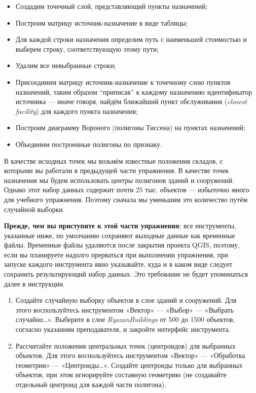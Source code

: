 \documentclass[
  12pt,
]{book}
\providecommand{\tightlist}{%
  \setlength{\itemsep}{0pt}\setlength{\parskip}{0pt}}
\begin{document}
\begin{itemize}
\tightlist
\item
  Создадим точечный слой, представляющий пункты назначений;
\item
  Построим матрицу источник-назначение в виде таблицы;
\item
  Для каждой строки назначения определим путь с наименьшей стоимостью и выберем строку, соответствующую этому пути;
\item
  Удалим все невыбранные строки;
\item
  Присоединим матрицу источник-назначение к точечному слою пунктов назначений, таким образом ``приписав'' к каждому назначению идентификатор источника --- иначе говоря, найдём ближайший пункт обслуживания (\emph{closest facility}) для каждого пункта назначения;
\item
  Построим диаграмму Вороного (полигоны Тиссена) на пунктах назначений;
\item
  Объединим построенные полигоны по признаку.
\end{itemize}

В качестве исходных точек мы возьмём известные положения складов, с которыми вы работали в предыдущей части упражнения. В качестве точек назначения мы будем использовать центры полигонов зданий и сооружений. Однако этот набор данных содержит почти 25 тыс. объектов --- избыточно много для учебного упражнения. Поэтому сначала мы уменьшим это количество путём случайной выборки.

\textbf{Прежде, чем вы приступите к этой части упражнения}: все инструменты, указанные ниже, по умолчанию сохраняют выходные данные как временные файлы. Временные файлы удаляются после закрытия проекта QGIS, поэтому, если вы планируете надолго прерваться при выполнении упражнения, при запуске каждого инструмента явно указывайте, куда и в каком виде следует сохранить результирующий набор данных. Это требование не будет упоминаться далее в инструкции.

\begin{enumerate}
\def\labelenumi{\arabic{enumi}.}
\item
  Создайте случайную выборку объектов в слое зданий и сооружений. Для этого воспользуйтесь инструментом «Вектор» --- «Выбор» --- «Выбрать случайно\ldots». Выберите в слое \emph{RyazanBuildings} от 500 до 1500 объектов, согласно указаниям преподавателя, и закройте интерфейс инструмента.
\item
  Рассчитайте положения центральных точек (центроидов) для выбранных объектов. Для этого воспользуйтесь инструментом «Вектор» --- «Обработка геометрии» --- «Центроиды\ldots». Создайте центроиды только для выбранных объектов, при этом игнорируйте составную геометрию (не создавайте отдельный центроид для каждой части полигона).
\end{enumerate}
\end{document}
